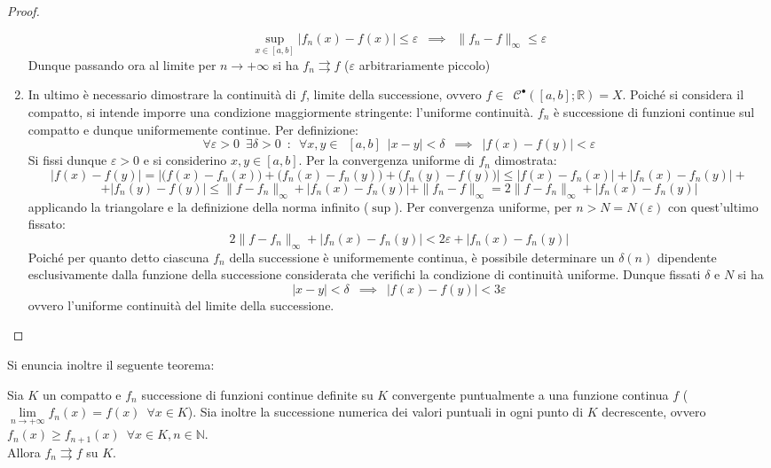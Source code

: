 \documentclass[10pt, oneside]{book}
\theoremstyle{plain}
\begin{document}
\begin{proof}
\begin{enumerate}
\[\sup\limits_{\displaystyle x \in [a,b]}|f_n(x) - f(x)| \leq \varepsilon \enspace \implies \enspace \|f_n - f\|_\infty \leq \varepsilon\]
Dunque passando ora al limite per $n \rightarrow +\infty$ si ha $f_n \rightrightarrows f$ ($\varepsilon$ arbitrariamente piccolo)
\item In ultimo è necessario dimostrare la continuità di $f$, limite della successione, ovvero $f \in \enspace \mathcal{C}^{•}([a,b] ; \mathbb{R}) = X$. Poiché si considera il compatto, si intende imporre una condizione maggiormente stringente: l'uniforme continuità. $f_n$ è successione di funzioni continue sul compatto e dunque uniformemente continue. Per definizione:
\[\forall \varepsilon > 0 \enspace \exists \delta > 0 \enspace : \enspace \forall x, y \in \enspace [a,b] \enspace |x - y| < \delta \enspace \implies \enspace |f(x) - f(y)| < \varepsilon\]
Si fissi dunque $\varepsilon > 0$ e si considerino $x, y \in [a,b]$. Per la convergenza uniforme di $f_n$ dimostrata:
\[|f(x) - f(y)| = |\big(f(x) - f_n(x)\big) + \big(f_n(x) - f_n(y)\big) + \big(f_n(y) - f(y)\big)| \leq |f(x) - f_n(x)| + |f_n(x) - f_n(y)| + \] 
\[+ |f_n(y) - f(y)| \leq \|f - f_n\|_\infty + |f_n(x) - f_n(y)| + \|f_n - f\|_\infty = 2 \|f - f_n\|_\infty + |f_n(x) - f_n(y)|\]
applicando la triangolare e la definizione della norma infinito ($\sup$). Per convergenza uniforme, per $n > N = N(\varepsilon)$ con quest'ultimo fissato:
\[ 2 \|f - f_n\|_\infty + |f_n(x) - f_n(y)| < 2\varepsilon + |f_n(x) - f_n(y)|\]
Poiché per quanto detto ciascuna $f_n$ della successione è uniformemente continua, è possibile determinare un $\delta(n)$ dipendente esclusivamente dalla funzione della successione considerata che verifichi la condizione di continuità uniforme. Dunque fissati $\delta$ e $N$ si ha
\[|x - y| < \delta \enspace \implies \enspace |f(x) - f(y)| < 3\varepsilon\]
ovvero l'uniforme continuità del limite della successione.
\end{enumerate}
\end{proof}

Si enuncia inoltre il seguente teorema:
\begin{ther}
Sia $K$ un compatto e $f_n$ successione di funzioni continue definite su $K$ convergente puntualmente a una funzione continua $f$ ($\displaystyle \lim\limits_{n \rightarrow +\infty} f_n(x) = f(x) \enspace \forall x \in K$). Sia inoltre la successione numerica dei valori puntuali in ogni punto di $K$ decrescente, ovvero $f_n(x) \geq f_{n+1}(x) \enspace \forall x \in K, n \in \mathbb{N}$.
\\Allora $f_n \rightrightarrows f$ su $K$.
\end{ther}
\end{document}
